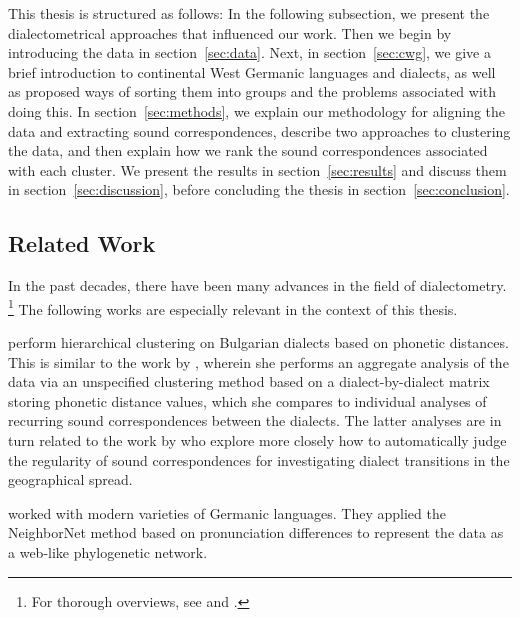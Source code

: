 \documentclass[a4paper]{article}
\begin{document}
This thesis is structured as follows:
In the following subsection, we present the
dialectometrical approaches that influenced our work.
Then we begin by introducing the data in section~\ref{sec:data}.
Next, in section~\ref{sec:cwg},
we give a brief introduction to continental West Germanic languages and dialects,
as well as proposed ways of sorting them into groups
and the problems associated with doing this.
In section~\ref{sec:methods}, we explain our methodology for
aligning the data and extracting sound correspondences,
describe two approaches to clustering the data,
and then explain how we rank the sound correspondences
associated with each cluster.
We present the results in section~\ref{sec:results}
and discuss them in section~\ref{sec:discussion},
before concluding the thesis in section~\ref{sec:conclusion}.

\subsection{Related Work}

In the past decades, there have been many advances in the field of dialectometry.%
\footnote{%
For thorough overviews, see \citet{nerbonne2009data} and \citet{wieling2015advances}.
}
The following works are especially relevant in the context of this thesis.

\citet{prokic2012detecting} perform hierarchical clustering
on Bulgarian dialects based on phonetic distances.
This is %
similar to the work by \citet{prokic2007identifying},
wherein she performs an aggregate analysis of the
data via an unspecified clustering method based on a
dialect-by-dialect matrix storing phonetic distance values,
which she compares to individual analyses of recurring sound correspondences
between the dialects.
The latter analyses are in turn related to the work by
\citet{prokic2013combining} who explore more closely how
to automatically judge the regularity of sound correspondences
for investigating dialect transitions in the geographical spread.

\citet{heggarty2010splits} worked with modern varieties of Germanic languages.
They applied the NeighborNet method \citep{bryant2004neighbornet}
based on pronunciation differences to represent the data as a
web-like phylogenetic network.
\end{document}
